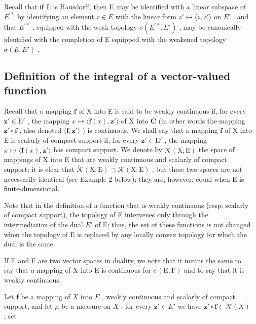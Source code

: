 Recall that if E is Hausdorff, then E may be identified with a linear subspace of \(E^{\prime*}\) by identifying an element \(z \in E\) with the linear form \(z' \mapsto \langle z, z' \rangle\) on \(E'\) , and that \(E^{\prime*}\) , equipped with the weak topology \(\sigma(E^{\prime*}, E')\) , may be canonically identified with the completion of E equipped with the weakened topology \(\sigma(E, E')\) .

\subsection{Definition of the integral of a vector-valued function}

Recall that a mapping \(\mathbf{f}\) of X into E is said to be weakly continuous if, for every \(\mathbf{z}' \in \mathrm{E}'\) , the mapping \(x \mapsto \langle \mathbf{f}(x), \mathbf{z}' \rangle\) of X into \(\mathbf{C}\) (in other words the mapping \(\mathbf{z}' \circ \mathbf{f}\) , also denoted \(\langle \mathbf{f}, \mathbf{z}' \rangle\) ) is continuous. We shall say that a mapping \(\mathbf{f}\) of X into E is scalarly of compact support if, for every \(\mathbf{z}' \in \mathrm{E}'\) , the mapping \(x \mapsto \langle \mathbf{f}(x), \mathbf{z}' \rangle\) has compact support. We denote by \(\widetilde{\mathcal{K}}(\mathrm{X};\mathrm{E})\) the space of mappings of X into E that are weakly continuous and scalarly of compact support; it is clear that \(\widetilde{\mathcal{K}}(\mathrm{X};\mathrm{E}) \supset \mathcal{K}(\mathrm{X};\mathrm{E})\) , but these two spaces are not necessarily identical (see Example 2 below); they are, however, equal when E is finite-dimensional.

Note that in the definition of a function that is weakly continuous (resp. scalarly of compact support), the topology of E intervenes only through the intermediation of the dual \(E'\) of E; thus, the set of these functions is not changed when the topology of E is replaced by any locally convex topology for which the dual is the same.

If E and F are two vector spaces in duality, we note that it means the same to say that a mapping of X into E is continuous for \(\sigma(\mathrm{E},\mathrm{F})\) and to say that it is weakly continuous.

Let \(\mathbf{f}\) be a mapping of \(X\) into \(E\) , weakly continuous and scalarly of compact support, and let \(\mu\) be a measure on \(X\) ; for every \(\mathbf{z}' \in E'\) we have \(\mathbf{z}' \circ \mathbf{f} \in \mathcal{K}(X)\) ; set

